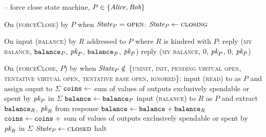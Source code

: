\begin{center}
  \begin{systembox}{\fchan{} -- force close state machine, $P \in \{\mathit{Alice},
  \mathit{Bob}\}$}
    \begin{algorithmic}[1]
      \State On (\textsc{forceClose}) by $P$ when $\itistate_P =
      \textsc{open}$:
      \Indent
        \State $\itistate_P \gets \textsc{closing}$
      \EndIndent
      \Statex

      \State On input (\textsc{balance}) by $R$ addressed to $P$ where $R$ is kindred with
      $P$:
      \Indent
          \State reply (\textsc{my balance}, $\texttt{balance}_{P}$, $\textit{pk}_{P}$,
          $\texttt{balance}_{\bar{P}}$, $\textit{pk}_{\bar{P}}$)
        \Else
          \State reply (\textsc{my balance}, $0$, $\textit{pk}_{P}$, $0$, $\textit{pk}_{\bar{P}}$)
        \EndIf
      \EndIndent
      \Statex

      \State On (\textsc{forceClose}, $P$) by \adversary when $\itistate_P \notin$
      \{\textsc{uninit}, \textsc{init}, \textsc{pending virtual open},
      \textsc{tentative virtual open}, \textsc{tentative base open},
      \textsc{ignored}\}:
      \label{code:functionality:close:check}
      \Indent
        \State input (\textsc{read}) to \ledger as $P$ and assign ouput to
        $\Sigma$
        \State $\texttt{coins}_{} \gets$ sum of values of outputs exclusively spendable
        or spent by $\textit{pk}_{P}$
        in $\Sigma$
        \label{code:functionality:close:coins}
        \State $\texttt{balance}_{} \gets \texttt{balance}_{P}$
          \State input (\textsc{balance}) to $R$ as $P$ and extract
          $\texttt{balance}_{R}$, $\textit{pk}_{R}$ from response
          \State $\texttt{balance}_{} \gets \texttt{balance}_{} + \texttt{balance}_{R}$
          \State $\texttt{coins}_{} \gets \texttt{coins}_{} \:+ $ sum of values of outputs
          exclusively spendable or spent by $\textit{pk}_{R}$ in $\Sigma$
        \EndFor
        \If{$\coins{} \geq \subbalance{}$}
        \label{code:functionality:close:check:if}
          \State $\itistate_P \gets \textsc{closed}$
        \Else \: 
          \State halt
          \label{code:functionality:close:halt}
        \EndIf
      \EndIndent
    \end{algorithmic}
  \end{systembox}
  \label{code:functionality:close}
\end{center} \ \\

